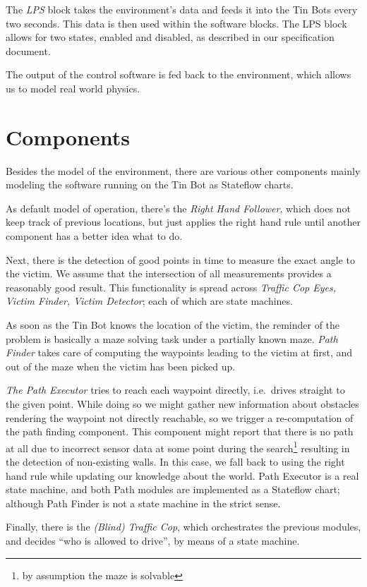 \documentclass[a4paper,parskip,headheight=38pt]{scrartcl} %
\begin{document}
The \emph{LPS} block takes the environment's data and feeds it into the Tin Bots every two seconds. This data is then used within the software blocks. The LPS block allows for two states, enabled and disabled, as described in our specification document.

The output of the control software is fed back to the environment, which allows us to model real world physics.

\section{Components}
Besides the model of the environment, there are various other components mainly modeling the software running on the Tin Bot as Stateflow charts.

As default model of operation, there's the \emph{Right Hand Follower}, which does not keep track of previous locations, but just applies the right hand rule until another component has a better idea what to do.

Next, there is the detection of good points in time to measure the exact angle to the victim.  We assume that the intersection of all measurements provides a reasonably good result.  This functionality is spread across \emph{Traffic Cop Eyes, Victim Finder, Victim Detector}; each of which are state machines.

As soon as the Tin Bot knows the location of the victim, the reminder of the problem is basically a maze solving task under a partially known maze. 
\emph{Path Finder} takes care of computing the waypoints leading to the victim at first, and out of the maze when the victim has been picked up. 

\emph{The Path Executor} tries to reach each waypoint directly, i.e.\ drives straight to the given point. 
While doing so we might gather new information about obstacles rendering the waypoint not directly reachable, so we trigger a re-computation of the path finding component. 
This component might report that there is no path at all due to incorrect sensor data at some point during the search\footnote{by assumption the maze is solvable} resulting in the detection of non-existing walls. 
In this case, we fall back to using the right hand rule while updating our knowledge about the world. Path Executor is a real state machine, and both Path modules are implemented as a Stateflow chart; although Path Finder is not a state machine in the strict sense.

Finally, there is the \emph{(Blind) Traffic Cop}, which orchestrates the previous modules, and decides \enquote{who is allowed to drive}, by means of a state machine.
\end{document}
